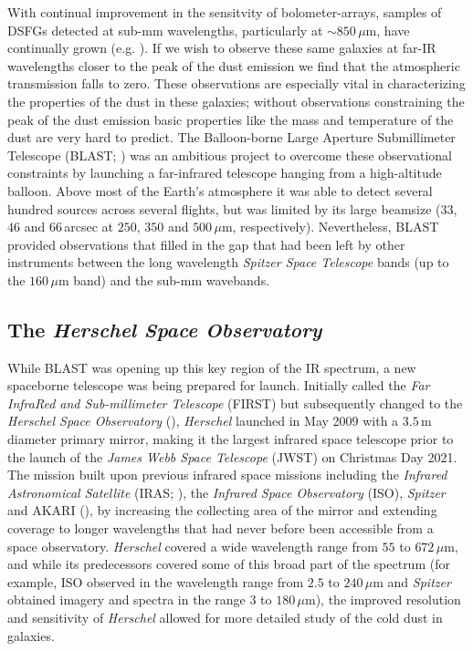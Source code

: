 With continual improvement in the sensitvity of bolometer-arrays, samples of DSFGs detected at sub-mm wavelengths, particularly at $\sim 850\,\mu$m, have continually grown (e.g. \citealt{Borys_2003, Coppin_2006, Weiss_2009}). If we wish to observe these same galaxies at far-IR wavelengths closer to the peak of the dust emission we find that the atmospheric transmission falls to zero. These observations are especially vital in characterizing the properties of the dust in these galaxies; without observations constraining the peak of the dust emission basic properties like the mass and temperature of the dust are very hard to predict. The Balloon-borne Large Aperture Submillimeter Telescope (BLAST; \citealt{Devlin_2009}) was an ambitious project to overcome these observational constraints by launching a far-infrared telescope hanging from a high-altitude balloon. Above most of the Earth's atmosphere it was able to detect several hundred sources across several flights, but was limited by its large beamsize ($33$, $46$ and $66\,$arcsec at $250$, $350$ and $500\,\mu$m, respectively). Nevertheless, BLAST provided observations that filled in the gap that had been left by other instruments between the long wavelength \textit{Spitzer Space Telescope} bands (up to the $160\,\mu$m band) and the sub-mm wavebands.

\subsection{The \textit{Herschel Space Observatory}}

While BLAST was opening up this key region of the IR spectrum, a new spaceborne telescope was being prepared for launch. Initially called the \textit{Far InfraRed and Sub-millimeter Telescope} (FIRST) but subsequently changed to the \textit{Herschel Space Observatory} (\citealt{Pilbratt_2010}), \textit{Herschel} launched in May 2009 with a $3.5\,$m diameter primary mirror, making it the largest infrared space telescope prior to the launch of the \textit{James Webb Space Telescope} (JWST) on Christmas Day 2021. The mission built upon previous infrared space missions including the \textit{Infrared Astronomical Satellite} (IRAS; \citealt{Neugebauer_1984}), the \textit{Infrared Space Observatory} (ISO), \textit{Spitzer} and AKARI (\citealt{Murakami_2007}), by increasing the collecting area of the mirror and extending coverage to longer wavelengths that had never before been accessible from a space observatory. \textit{Herschel} covered a wide wavelength range from $55$ to $672\,\mu$m, and while its predecessors covered some of this broad part of the spectrum (for example, ISO observed in the wavelength range from $2.5$ to $240\,\mu$m and \textit{Spitzer} obtained imagery and spectra in the range $3$ to $180\,\mu$m), the improved resolution and sensitivity of \textit{Herschel} allowed for more detailed study of the cold dust in galaxies.

